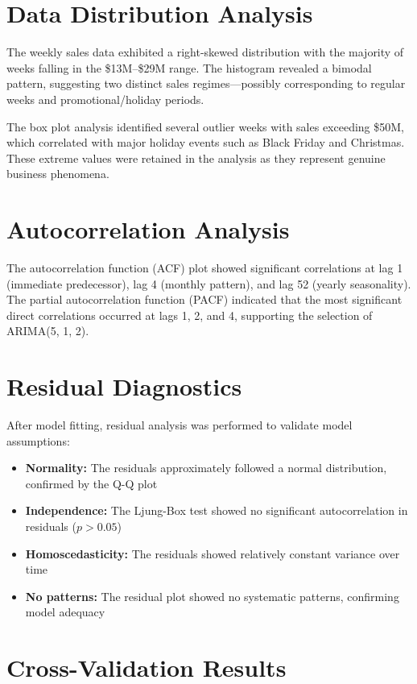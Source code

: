\documentclass[12pt,a4paper]{report}
\begin{document}
\section{Data Distribution Analysis}

The weekly sales data exhibited a right-skewed distribution with the majority of weeks falling in the \$13M--\$29M range. The histogram revealed a bimodal pattern, suggesting two distinct sales regimes---possibly corresponding to regular weeks and promotional/holiday periods.

The box plot analysis identified several outlier weeks with sales exceeding \$50M, which correlated with major holiday events such as Black Friday and Christmas. These extreme values were retained in the analysis as they represent genuine business phenomena.

\section{Autocorrelation Analysis}

The autocorrelation function (ACF) plot showed significant correlations at lag 1 (immediate predecessor), lag 4 (monthly pattern), and lag 52 (yearly seasonality). The partial autocorrelation function (PACF) indicated that the most significant direct correlations occurred at lags 1, 2, and 4, supporting the selection of ARIMA(5, 1, 2).

\section{Residual Diagnostics}

After model fitting, residual analysis was performed to validate model assumptions:

\begin{itemize}
    \item \textbf{Normality:} The residuals approximately followed a normal distribution, confirmed by the Q-Q plot
    \item \textbf{Independence:} The Ljung-Box test showed no significant autocorrelation in residuals ($p > 0.05$)
    \item \textbf{Homoscedasticity:} The residuals showed relatively constant variance over time
    \item \textbf{No patterns:} The residual plot showed no systematic patterns, confirming model adequacy
\end{itemize}

\section{Cross-Validation Results}
\end{document}
